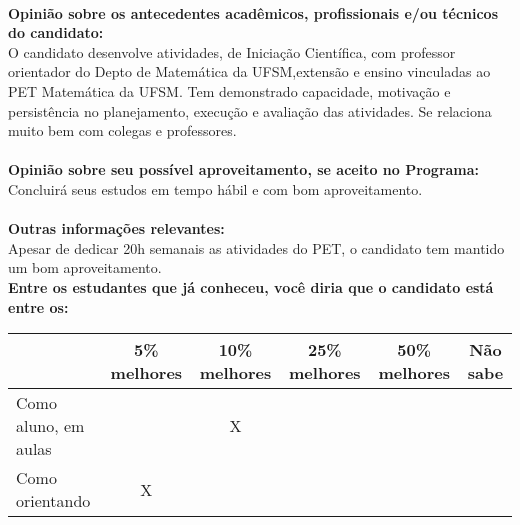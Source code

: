 \documentclass[11pt]{article}
\begin{document}
\\
\textbf{Opinião sobre os antecedentes acadêmicos, profissionais e/ou técnicos do candidato:}
\\O candidato desenvolve atividades, de Iniciação Científica, com professor orientador do Depto de Matemática da UFSM,extensão e ensino vinculadas ao PET Matemática da UFSM. Tem demonstrado capacidade, motivação e persistência no planejamento, execução e avaliação das atividades. Se relaciona muito bem com colegas e professores.\\
\\
\textbf{Opinião sobre seu possível aproveitamento, se aceito no Programa:}
\\Concluirá seus estudos em tempo hábil e com bom aproveitamento.\\ 
\\
\textbf{Outras informações relevantes:} \\Apesar de dedicar 20h semanais as atividades do PET, o candidato tem mantido um bom aproveitamento.
\\[0.3cm]
\textbf{Entre os estudantes que já conheceu, você diria que o candidato está entre os:}
\\
\begin{tabular}{|l|c|c|c|c|c|}
\hline
 & 5\% melhores & 10\% melhores & 25\% melhores & 50\% melhores & Não sabe \\
\hline
Como aluno, em aulas &  & X &  &  & \\
\hline
Como orientando & X &  &  &  & \\
\hline
\end{tabular}
\end{document}
